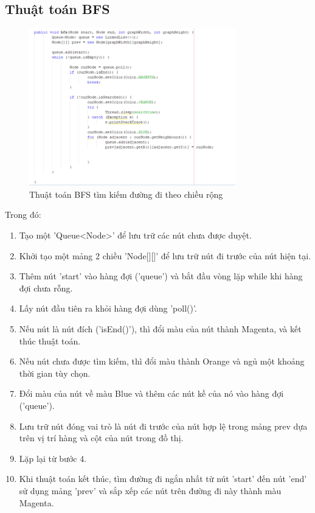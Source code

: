\subsection{Thuật toán BFS}
\begin{figure}[h!]
	\centering
	\includegraphics[width=0.8\textwidth]{
		Figures/figs/9.PNG
	}
	\caption[Thuật toán BFS tìm kiếm đường đi theo chiều rộng]{
		Thuật toán BFS tìm kiếm đường đi theo chiều rộng 
	}
	\label{fig:hinhm}
\end{figure}

Trong đó:
\begin{enumerate}
	\item Tạo một 'Queue<Node>' để lưu trữ các nút chưa được duyệt.
	\item Khởi tạo một mảng 2 chiều 'Node[][]' để lưu trữ nút đi trước của nút hiện tại.
	\item Thêm nút 'start' vào hàng đợi ('queue') và bắt đầu vòng lặp while khi hàng đợi chưa rỗng.
	\item Lấy nút đầu tiên ra khỏi hàng đợi dùng 'poll()'.
	\item Nếu nút là nút đích ('isEnd()'), thì đổi màu của nút thành Magenta, và kết thúc thuật toán.
	\item Nếu nút chưa được tìm kiếm, thì đổi màu thành Orange và ngủ một khoảng thời gian tùy chọn.
	\item Đổi màu của nút về màu Blue và thêm các nút kề của nó vào hàng đợi ('queue').
	\item Lưu trữ nút đóng vai trò là nút đi trước của nút hợp lệ trong mảng prev dựa trên vị trí hàng và cột của nút trong đồ thị.
	\item Lặp lại từ bước 4.
	\item Khi thuật toán kết thúc, tìm đường đi ngắn nhất từ nút 'start' đến nút 'end' sử dụng mảng 'prev' và sắp xếp các nút trên đường đi này thành màu Magenta.
\end{enumerate}

